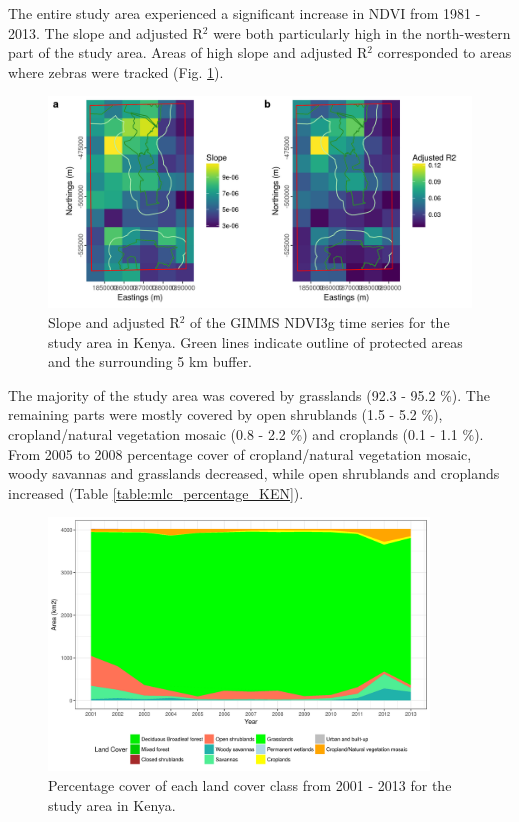 \documentclass[12pt,a4paper, twoside, english]{article}
\begin{document}
The entire study area experienced a significant increase in NDVI from 1981 - 2013. The slope and adjusted R$^2$ were both particularly high in the north-western part of the study area. Areas of high slope and adjusted R$^2$ corresponded to areas where zebras were tracked (Fig. \ref{fig:gimms_ken}).

\begin{figure}[H]
  \centering
  \includegraphics[width=\textwidth]{figures/Gimms_NDVI_KEN.png}
  \caption[Protection trend Laikipia]{Slope and adjusted R$^2$ of the GIMMS NDVI3g time series for the study area in Kenya. Green lines indicate outline of protected areas and the surrounding 5 km buffer.}
  \label{fig:gimms_ken}
\end{figure}

The majority of the study area was covered by grasslands (92.3 - 95.2 \%). The remaining parts were mostly covered by open shrublands (1.5 - 5.2 \%), cropland/natural vegetation mosaic (0.8 - 2.2 \%) and croplands (0.1 - 1.1 \%). From 2005 to 2008 percentage cover of cropland/natural vegetation mosaic, woody savannas and grasslands decreased, while open shrublands and croplands increased (Table \ref{table:mlc_percentage_KEN}).

\begin{figure}[H]
  \centering
  \includegraphics[width=0.9\textwidth]{figures/MLC_Timeseries_KEN.png}
  \caption[Land cover time series of Laikipia]{Percentage cover of each land cover class from 2001 - 2013 for the study area in Kenya.}
  \label{fig:mlc_ts_ken}
\end{figure}
\end{document}
